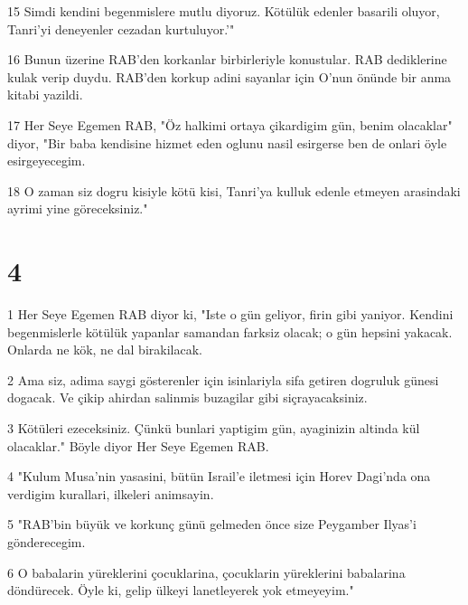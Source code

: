 \par 15 Simdi kendini begenmislere mutlu diyoruz. Kötülük edenler basarili oluyor, Tanri'yi deneyenler cezadan kurtuluyor.'"
\par 16 Bunun üzerine RAB'den korkanlar birbirleriyle konustular. RAB dediklerine kulak verip duydu. RAB'den korkup adini sayanlar için O'nun önünde bir anma kitabi yazildi.
\par 17 Her Seye Egemen RAB, "Öz halkimi ortaya çikardigim gün, benim olacaklar" diyor, "Bir baba kendisine hizmet eden oglunu nasil esirgerse ben de onlari öyle esirgeyecegim.
\par 18 O zaman siz dogru kisiyle kötü kisi, Tanri'ya kulluk edenle etmeyen arasindaki ayrimi yine göreceksiniz."

\chapter{4}

\par 1 Her Seye Egemen RAB diyor ki, "Iste o gün geliyor, firin gibi yaniyor. Kendini begenmislerle kötülük yapanlar samandan farksiz olacak; o gün hepsini yakacak. Onlarda ne kök, ne dal birakilacak.
\par 2 Ama siz, adima saygi gösterenler için isinlariyla sifa getiren dogruluk günesi dogacak. Ve çikip ahirdan salinmis buzagilar gibi siçrayacaksiniz.
\par 3 Kötüleri ezeceksiniz. Çünkü bunlari yaptigim gün, ayaginizin altinda kül olacaklar." Böyle diyor Her Seye Egemen RAB.
\par 4 "Kulum Musa'nin yasasini, bütün Israil'e iletmesi için Horev Dagi'nda ona verdigim kurallari, ilkeleri animsayin.
\par 5 "RAB'bin büyük ve korkunç günü gelmeden önce size Peygamber Ilyas'i gönderecegim.
\par 6 O babalarin yüreklerini çocuklarina, çocuklarin yüreklerini babalarina döndürecek. Öyle ki, gelip ülkeyi lanetleyerek yok etmeyeyim."


